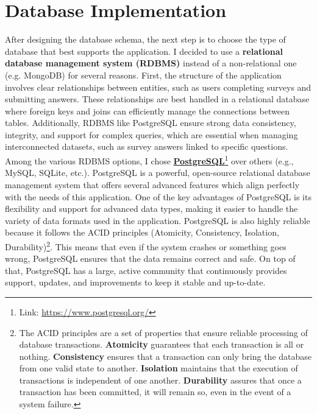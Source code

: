 \section{Database Implementation}
After designing the database schema, the next step is to choose the type of database that best supports the application. I decided to use a \textbf{relational database management system (RDBMS)} instead of a non-relational one (e.g. MongoDB) for several reasons. First, the structure of the application involves clear relationships between entities, such as users completing surveys and submitting answers. These relationships are best handled in a relational database where foreign keys and joins can efficiently manage the connections between tables. Additionally, RDBMS like PostgreSQL ensure strong data consistency, integrity, and support for complex queries, which are essential when managing interconnected datasets, such as survey answers linked to specific questions.\vspace{5mm} \\
Among the various RDBMS options, I chose \textbf{\href{https://www.postgresql.org/}{PostgreSQL}}\footnote{Link: \url{https://www.postgresql.org/}} over others (e.g., MySQL, SQLite, etc.). PostgreSQL is a powerful, open-source relational database management system that offers several advanced features which align perfectly with the needs of this application. One of the key advantages of PostgreSQL is its flexibility and support for advanced data types, making it easier to handle the variety of data formats used in the application. PostgreSQL is also highly reliable because it follows the ACID principles (Atomicity, Consistency, Isolation, Durability)\footnote{The ACID principles are a set of properties that ensure reliable processing of database transactions. \textbf{Atomicity} guarantees that each transaction is all or nothing. \textbf{Consistency} ensures that a transaction can only bring the database from one valid state to another. \textbf{Isolation} maintains that the execution of transactions is independent of one another. \textbf{Durability} assures that once a transaction has been committed, it will remain so, even in the event of a system failure.}. This means that even if the system crashes or something goes wrong, PostgreSQL ensures that the data remains correct and safe. On top of that, PostgreSQL has a large, active community that continuously provides support, updates, and improvements to keep it stable and up-to-date.

